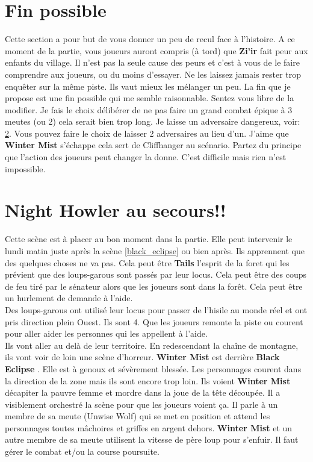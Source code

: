 \documentclass[oneside,12pt]{book}
\newcommand{\BlackEclipse}{\textbf{Black Eclipse} }
\newcommand{\Tails}{\textbf{Tails} }
\newcommand{\Thomas}{\textbf{Zi'ir} }
\begin{document}
\begin{flushleft}
\section{Fin possible}
Cette section a pour but de vous donner un peu de recul face à l'histoire. A ce moment de la partie, vous joueurs auront compris (à tord) que \Thomas fait peur aux enfants du village. Il n'est pas la seule cause des peurs et c'est à vous de le faire comprendre aux joueurs, ou du moins d'essayer. Ne les laissez jamais rester trop enquêter sur la même piste. Ils vaut mieux les mélanger un peu. La fin que je propose est une fin possible qui me semble raisonnable. Sentez vous libre de la modifier. Je fais le choix délibérer de ne pas faire un grand combat épique à 3 meutes (ou 2) cela serait bien trop long. Je laisse un adversaire dangereux, voir: \ref{ausecours}.
Vous pouvez faire le choix de laisser 2 adversaires au lieu d'un. J'aime que \textbf{Winter Mist} s'échappe cela sert de Cliffhanger au scénario. Partez du principe que l'action des joueurs peut changer la donne. C'est difficile mais rien n'est impossible.

\section{Night Howler au secours!!}
\label{ausecours}
Cette scène est à placer au bon moment dans la partie. Elle peut intervenir le lundi matin juste  après la scène \ref{black_eclipse} ou bien après. 
Ils apprennent que des quelques choses ne va pas. Cela peut être \Tails l'esprit de la foret qui les prévient que des loups-garous sont passés par leur locus. Cela peut être des coups de feu tiré par le sénateur alors que les joueurs sont dans la forêt. Cela peut être un hurlement de demande à l'aide. \\
Des loups-garous ont utilisé leur locus pour passer de l'hisile au monde réel et ont pris direction plein Ouest. Ils sont 4. Que les joueurs remonte la piste ou courent pour aller aider les personnes qui les appellent à l'aide. \\
Ils vont aller au delà de leur territoire. En redescendant la chaîne de montagne, ils vont voir de loin une scène d'horreur. 
\textbf{Winter Mist} est derrière \BlackEclipse. Elle est à genoux et sévèrement blessée. Les personnages courent dans la direction de la zone mais ils sont encore trop loin. Ils voient \textbf{Winter Mist} décapiter la pauvre femme et mordre dans la joue de la tête découpée. Il a visiblement orchestré la scène pour que les joueurs voient ça. Il parle à un membre de sa meute (Unwise Wolf) qui se met en position et attend les personnages toutes mâchoires et griffes en argent dehors. \textbf{Winter Mist} et un autre membre de sa meute utilisent la vitesse de père loup pour s'enfuir. Il faut gérer le combat et/ou la course poursuite.  


\end{flushleft}
\end{document}
